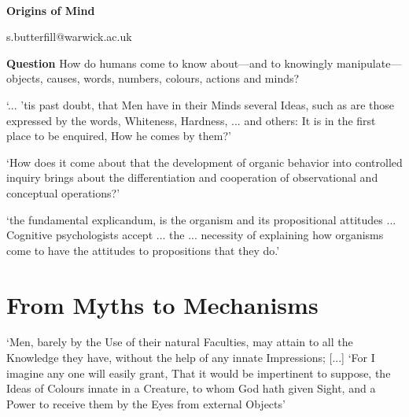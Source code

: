 \documentclass[12pt]{extarticle}
\date{}
\makeatletter
\def \ititle {Origins of Mind}
\def \isubtitle {Lecture 01}
\def \iemail{s.butterfill@warwick.ac.uk}
\makeatother
\begin{document}
\begin{multicols}{3}

\setlength\footnotesep{1em}






\

\begin{center}
{\Large
\textbf{\ititle}
}

\iemail %

\end{center}


 
 \def \ititle {Origins of Mind}
 
\def \isubtitle {Lecture 01}
 
 
 
\textbf{Question}
How do humans come to know about---and to knowingly manipulate---objects, causes, words, numbers, colours, actions and minds?
 
‘... ’tis past doubt, that Men have in their Minds several Ideas, such as are those expressed by the words, Whiteness, Hardness, ... and others: It is in the first place to be enquired, How he comes by them?’
\citep[p.\ 104]{Locke:1975qo}
 
‘How does it come about that the development of organic behavior into controlled inquiry brings about the differentiation and cooperation of observational and conceptual operations?’
\citep[p.\ 12]{Dewey:1938yp}
 
‘the fundamental explicandum, is the organism and its propositional attitudes ... Cognitive psychologists accept ... the ... necessity of explaining how organisms come to have the attitudes to propositions that they do.’
\citep[p.\ 198]{Fodor:1975pb}
 
 
 
\section{From Myths to Mechanisms}
 
‘Men, barely by the Use of their natural Faculties, may attain to all the Knowledge they have, without the help of any innate Impressions; [...]
‘For I imagine any one will easily grant, That it would be impertinent to suppose, the Ideas of Colours innate in a Creature, to whom God hath given Sight, and a Power to receive them by the Eyes from external Objects’
\citep[p.\ 48]{Locke:1975qo}
 

\end{multicols}
\end{document}
